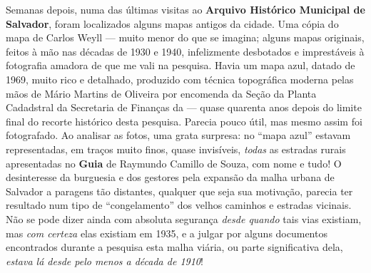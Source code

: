 Semanas depois, numa das últimas visitas ao \textbf{Arquivo Histórico Municipal de Salvador}, foram localizados alguns mapas antigos da cidade. Uma cópia do mapa de Carlos Weyll --- muito menor do que se imagina; alguns mapas originais, feitos à mão nas décadas de 1930 e 1940, infelizmente desbotados e imprestáveis à fotografia amadora de que me vali na pesquisa. Havia um mapa azul, datado de 1969, muito rico e detalhado, produzido com técnica topográfica moderna pelas mãos de Mário Martins de Oliveira por encomenda da Seção da Planta Cadadstral da Secretaria de Finanças da  --- quase quarenta anos depois do limite final do recorte histórico desta pesquisa. Parecia pouco útil, mas mesmo assim foi fotografado. Ao analisar as fotos, uma grata surpresa: no ``mapa azul'' estavam representadas, em traços muito finos, quase invisíveis, \textit{todas} as estradas rurais apresentadas no \textbf{Guia} de Raymundo Camillo de Souza, com nome e tudo! O desinteresse da burguesia e dos gestores pela expansão da malha urbana de Salvador a paragens tão distantes, qualquer que seja sua motivação, parecia ter resultado num tipo de ``congelamento'' dos velhos caminhos e estradas vicinais. Não se pode dizer ainda com absoluta segurança \textit{desde quando} tais vias existiam, mas \textit{com certeza} elas existiam em 1935, e a julgar por alguns documentos encontrados durante a pesquisa esta malha viária, ou parte significativa dela, \textit{estava lá desde pelo menos a década de 1910}!

